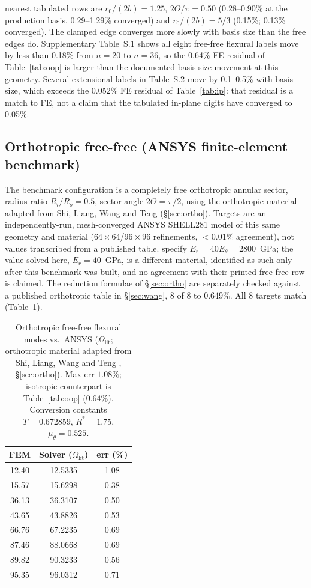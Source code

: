 \documentclass[11pt]{article}
\begin{document}
nearest tabulated rows are $r_0/(2b)=1.25$, $2\Theta/\pi=0.50$
(0.28--0.90\% at the production basis, 0.29--1.29\% converged) and
$r_0/(2b)=5/3$ (0.15\%; 0.13\% converged). The clamped edge converges
more slowly with basis size than the free edges do. Supplementary
Table~S.1 shows all eight free-free flexural labels move by less than
0.18\% from $n=20$ to $n=36$, so the 0.64\% FE residual of
Table~\ref{tab:oop} is larger than the documented basis-size movement at
this geometry. Several extensional labels in Table~S.2 move by 0.1--0.5\%
with basis size, which exceeds the 0.052\% FE residual of
Table~\ref{tab:ip}: that residual is a match to FE, not a claim that the
tabulated in-plane digits have converged to 0.05\%.
\subsection{Orthotropic free-free (ANSYS finite-element benchmark)}
The benchmark configuration is a completely free orthotropic annular
sector, radius ratio $R_i/R_o=0.5$, sector angle $2\Theta=\pi/2$, using the
orthotropic material adapted from Shi, Liang, Wang and Teng \cite{shi2016}
(\S\ref{sec:ortho}). Targets are an independently-run, mesh-converged
ANSYS \cite{ansys} SHELL281 model of this same geometry and material
($64\times64$/$96\times96$ refinements, $<0.01\%$ agreement), not values
transcribed from a published table. \cite{shi2016} specify
$E_r=40E_\theta=2800$~GPa; the value solved here, $E_r=40$~GPa, is a
different material, identified as such only after this benchmark was
built, and no agreement with their printed free-free row is claimed. The
reduction formulae of \S\ref{sec:ortho} are separately checked against a
published orthotropic table in \S\ref{sec:wang}, 8 of 8 to $0.649\%$.
All 8 targets match (Table~\ref{tab:shi}).

\begin{table}[h]\centering\small
\caption{Orthotropic free-free flexural modes vs.\ ANSYS
($\Omega_{\mathrm{lit}}$; orthotropic material adapted from
Shi, Liang, Wang and Teng \cite{shi2016}, \S\ref{sec:ortho}).
Max err $1.08\%$; isotropic counterpart is Table~\ref{tab:oop} ($0.64\%$).
Conversion constants $T=0.672859$, $R^{*}=1.75$, $\mu_\theta=0.525$.}
\label{tab:shi}
\begin{tabular}{ccc}
\toprule FEM & Solver ($\Omega_{\mathrm{lit}}$) & err (\%)\\ \midrule
12.40 & 12.5335 & 1.08\\
15.57 & 15.6298 & 0.38\\
36.13 & 36.3107 & 0.50\\
43.65 & 43.8826 & 0.53\\
66.76 & 67.2235 & 0.69\\
87.46 & 88.0668 & 0.69\\
89.82 & 90.3233 & 0.56\\
95.35 & 96.0312 & 0.71\\
\bottomrule
\end{tabular}
\end{table}
\end{document}
